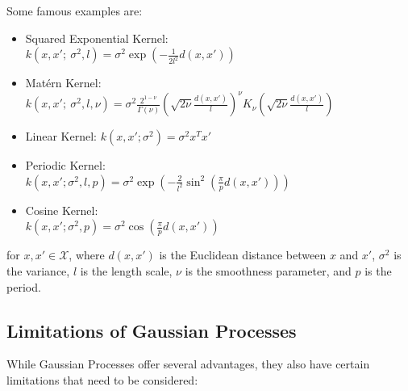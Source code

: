 \documentclass[preprint,journal]{vgtc}       %
\begin{document}
Some famous examples are:

\begin{itemize}
  \item Squared Exponential Kernel:\\ $k(x, x';\ \sigma^2, l) = \sigma^2 \exp(-\frac{1}{2l^2}d(x,x'))$
  \item Matérn Kernel:\\ $k(x, x';\ \sigma^2, l, \nu) = \sigma^2 \frac{2^{1-\nu}}{\Gamma(\nu)}(\sqrt{2\nu}\frac{d(x, x')}{l})^\nu K_\nu(\sqrt{2\nu}\frac{d(x, x')}{l})$
  \item Linear Kernel: $k(x, x'; \sigma^2) = \sigma^2 x^Tx'$
  \item Periodic Kernel:\\ $k(x, x'; \sigma^2, l, p) = \sigma^2 \exp(-\frac{2}{l^2}\sin^2(\frac{\pi}{p}d(x, x')))$
  \item Cosine Kernel:\\ $k(x, x'; \sigma^2, p) = \sigma^2 \cos(\frac{\pi}{p}d(x, x'))$
\end{itemize}

for $x, x' \in \mathcal{X}$, where $d(x, x')$ is the Euclidean distance between $x$ and $x'$, $\sigma^2$ is the variance, $l$ is the length scale, $\nu$ is the smoothness parameter, and $p$ is the period.


\subsection{Limitations of Gaussian Processes}

While Gaussian Processes offer several advantages, they also have certain limitations that need to be considered:
\end{document}
